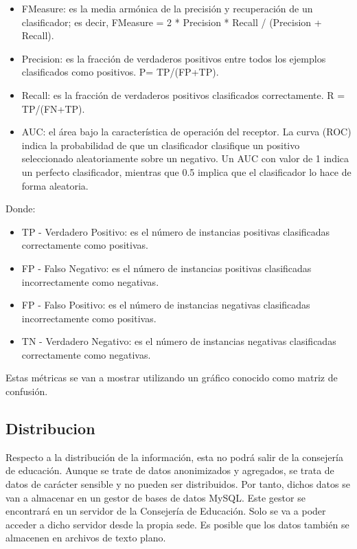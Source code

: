 \begin{itemize}
	\item FMeasure: es la media armónica de la precisión y recuperación de un clasificador; es decir, FMeasure = 2 * Precision * Recall / (Precision + Recall).
	\item Precision: es la fracción de verdaderos positivos entre todos los ejemplos clasificados como positivos. P= TP/(FP+TP).
	\item Recall: es la fracción de verdaderos positivos clasificados correctamente. R = TP/(FN+TP).
	\item AUC: el área bajo la característica de operación del receptor. La curva (ROC) indica la probabilidad de que un clasificador clasifique un positivo seleccionado aleatoriamente sobre un negativo. Un AUC con valor de 1 indica un perfecto clasificador, mientras que 0.5 implica que el clasificador lo hace de forma aleatoria.
\end{itemize}

Donde:
\begin{itemize}
	\item TP - Verdadero Positivo: es el número de instancias positivas clasificadas correctamente como positivas. 
	\item FP - Falso Negativo: es el número de instancias positivas clasificadas incorrectamente como negativas.
	\item FP - Falso Positivo: es el número de instancias negativas clasificadas incorrectamente como positivas.
	\item TN - Verdadero Negativo: es el número de instancias negativas clasificadas correctamente como negativas.
\end{itemize}

Estas métricas se van a mostrar utilizando un gráfico conocido como matriz de confusión.


\subsection{Distribucion}
Respecto a la distribución de la información, esta no podrá salir de la consejería de educación. Aunque se trate de datos anonimizados y agregados, se trata de datos de carácter sensible y no pueden ser distribuidos. Por tanto, dichos datos se van a almacenar en un gestor de bases de datos MySQL. Este gestor se encontrará en un servidor de la Consejería de Educación. Solo se va a poder acceder a dicho servidor desde la propia sede. Es posible que los datos también se almacenen en archivos de texto plano.




